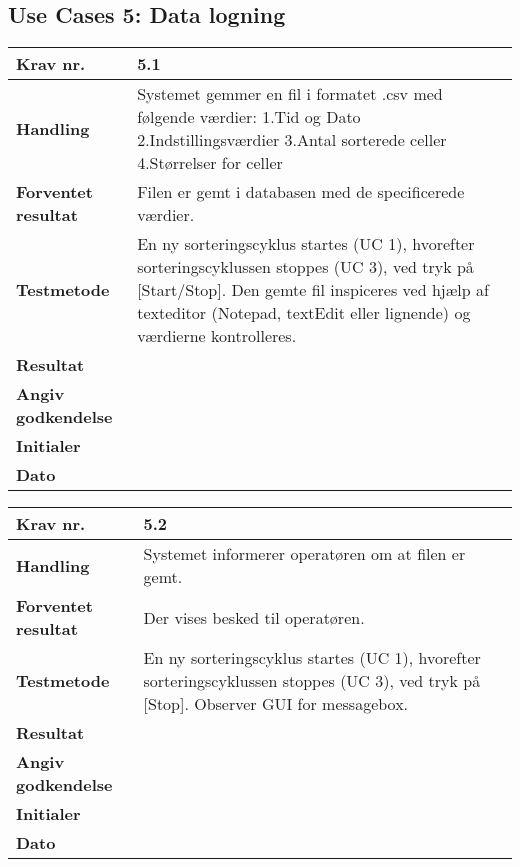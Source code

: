   \subsection{Use Cases 5: Data logning}

	\begin{center}
		\begin{longtable}{ | m{4cm}| m{8.5cm}|} 
			\hline
			\textbf{Krav nr.} & 5.1 \\ 
			\hline
			\textbf{Handling} & Systemet gemmer en fil i formatet .csv med følgende værdier:
1.Tid og Dato
2.Indstillingsværdier
3.Antal sorterede celler
4.Størrelser for celler  \\
			\hline
			\textbf{Forventet resultat} & Filen er gemt i databasen med de specificerede værdier.  \\
			\hline
			\textbf{Testmetode}  & En ny sorteringscyklus startes (UC 1), hvorefter sorteringscyklussen stoppes (UC 3), ved tryk på [Start/Stop]. 
Den gemte fil inspiceres ved hjælp af texteditor (Notepad, textEdit eller lignende) og værdierne kontrolleres.  \\
			\hline
			\textbf{Resultat}  &    \\
			\hline
			\textbf{Angiv godkendelse} &     \\
			\hline
			\textbf{Initialer} &     \\
			\hline
			\textbf{Dato} &    \\
			\hline
		\end{longtable}
	\end{center}			

	\begin{center}
		\begin{longtable}{ | m{4cm}| m{8.5cm}|} 
			\hline
			\textbf{Krav nr.} & 5.2 \\ 
			\hline
			\textbf{Handling} & Systemet informerer operatøren om at filen er gemt.  \\
			\hline
			\textbf{Forventet resultat} & Der vises besked til operatøren.  \\
			\hline
			\textbf{Testmetode}  & En ny sorteringscyklus startes (UC 1), hvorefter sorteringscyklussen stoppes (UC 3), ved tryk på [Stop]. Observer GUI for messagebox.  \\
			\hline
			\textbf{Resultat}  &    \\
			\hline
			\textbf{Angiv godkendelse} &     \\
			\hline
			\textbf{Initialer} &     \\
			\hline
			\textbf{Dato} &    \\
			\hline
		\end{longtable}
	\end{center}